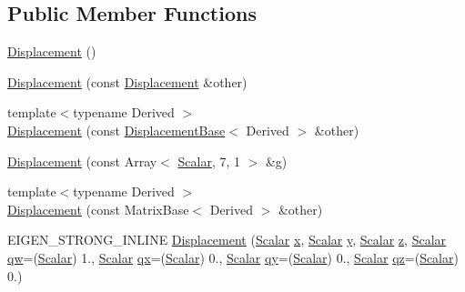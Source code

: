 \subsection*{Public Member Functions}
\begin{DoxyCompactItemize}
\item 
\hyperlink{class_displacement_a78920473a1b63b88597d9cc0e749b908}{Displacement} ()
\item 
\hyperlink{class_displacement_ac23802122cd27f1ba1f1eb70d71e5e09}{Displacement} (const \hyperlink{class_displacement}{Displacement} \&other)
\item 
{\footnotesize template$<$typename Derived $>$ }\\\hyperlink{class_displacement_a0bd84d9630e7a5c11304c07002d7ecc8}{Displacement} (const \hyperlink{class_displacement_base}{Displacement\+Base}$<$ Derived $>$ \&other)
\item 
\hyperlink{class_displacement_a252b0c985fe974b166d8d4b124ec0d5f}{Displacement} (const Array$<$ \hyperlink{class_displacement_ade979a89a65e3b67dea322a0cef92c88}{Scalar}, 7, 1 $>$ \&g)
\item 
{\footnotesize template$<$typename Derived $>$ }\\\hyperlink{class_displacement_a3b597e27e21d96f0aa0481c2a161248f}{Displacement} (const Matrix\+Base$<$ Derived $>$ \&other)
\item 
E\+I\+G\+E\+N\+\_\+\+S\+T\+R\+O\+N\+G\+\_\+\+I\+N\+L\+I\+NE \hyperlink{class_displacement_a26ee41b979d5949bab068bc3642d9828}{Displacement} (\hyperlink{class_displacement_ade979a89a65e3b67dea322a0cef92c88}{Scalar} \hyperlink{class_displacement_base_ae2b6ce0d58e72f8d36942204303960c1}{x}, \hyperlink{class_displacement_ade979a89a65e3b67dea322a0cef92c88}{Scalar} \hyperlink{class_displacement_base_ad23b504e3f85c99bd0a293aef8e823bf}{y}, \hyperlink{class_displacement_ade979a89a65e3b67dea322a0cef92c88}{Scalar} \hyperlink{class_displacement_base_ac0d87fc13d3610e764501cd857178a9f}{z}, \hyperlink{class_displacement_ade979a89a65e3b67dea322a0cef92c88}{Scalar} \hyperlink{class_displacement_base_afc5d0180532098927ad33b2ad9b91ec4}{qw}=(\hyperlink{class_displacement_ade979a89a65e3b67dea322a0cef92c88}{Scalar}) 1., \hyperlink{class_displacement_ade979a89a65e3b67dea322a0cef92c88}{Scalar} \hyperlink{class_displacement_base_ae37c8d2f1d0a6ca84550ab87dec7069d}{qx}=(\hyperlink{class_displacement_ade979a89a65e3b67dea322a0cef92c88}{Scalar}) 0., \hyperlink{class_displacement_ade979a89a65e3b67dea322a0cef92c88}{Scalar} \hyperlink{class_displacement_base_af0016b6fed409308e531b4945d60b99a}{qy}=(\hyperlink{class_displacement_ade979a89a65e3b67dea322a0cef92c88}{Scalar}) 0., \hyperlink{class_displacement_ade979a89a65e3b67dea322a0cef92c88}{Scalar} \hyperlink{class_displacement_base_a5fb14d5bda1d8531de6b6b2b05b52d5a}{qz}=(\hyperlink{class_displacement_ade979a89a65e3b67dea322a0cef92c88}{Scalar}) 0.)

\end{DoxyCompactItemize}

